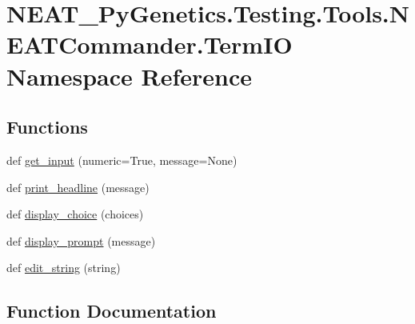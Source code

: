 \hypertarget{namespaceNEAT__PyGenetics_1_1Testing_1_1Tools_1_1NEATCommander_1_1TermIO}{}\section{N\+E\+A\+T\+\_\+\+Py\+Genetics.\+Testing.\+Tools.\+N\+E\+A\+T\+Commander.\+Term\+IO Namespace Reference}
\label{namespaceNEAT__PyGenetics_1_1Testing_1_1Tools_1_1NEATCommander_1_1TermIO}
\subsection*{Functions}
\begin{DoxyCompactItemize}
\item 
def \hyperlink{namespaceNEAT__PyGenetics_1_1Testing_1_1Tools_1_1NEATCommander_1_1TermIO_a6b8c65ea76935ac7741d8f42beaf32bc}{get\+\_\+input} (numeric=True, message=None)
\item 
def \hyperlink{namespaceNEAT__PyGenetics_1_1Testing_1_1Tools_1_1NEATCommander_1_1TermIO_aed8732bee31b808c0a932577c09af7b8}{print\+\_\+headline} (message)
\item 
def \hyperlink{namespaceNEAT__PyGenetics_1_1Testing_1_1Tools_1_1NEATCommander_1_1TermIO_a12078a8b0082fff852632e8d277f250a}{display\+\_\+choice} (choices)
\item 
def \hyperlink{namespaceNEAT__PyGenetics_1_1Testing_1_1Tools_1_1NEATCommander_1_1TermIO_aa3ac7abbb10860e8eadaf3051f7c95ce}{display\+\_\+prompt} (message)
\item 
def \hyperlink{namespaceNEAT__PyGenetics_1_1Testing_1_1Tools_1_1NEATCommander_1_1TermIO_a6049057ab7e63575b93ee72b61666a62}{edit\+\_\+string} (string)
\end{DoxyCompactItemize}


\subsection{Function Documentation}
